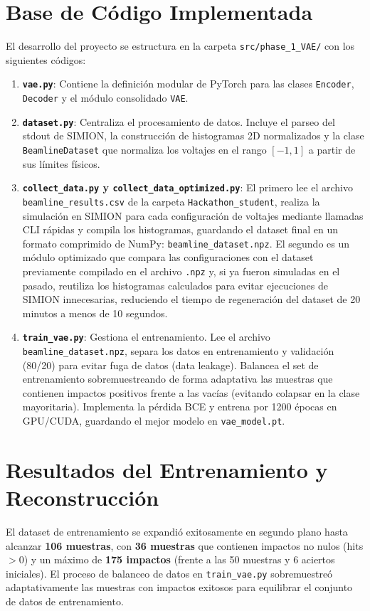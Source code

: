 \documentclass[12pt,letterpaper]{article}
\begin{document}
\section{Base de Código Implementada}
El desarrollo del proyecto se estructura en la carpeta \texttt{src/phase\_1\_VAE/} con los siguientes códigos:

\begin{enumerate}
    \item \textbf{\texttt{vae.py}}: Contiene la definición modular de PyTorch para las clases \texttt{Encoder}, \texttt{Decoder} y el módulo consolidado \texttt{VAE}.
    \item \textbf{\texttt{dataset.py}}: Centraliza el procesamiento de datos. Incluye el parseo del stdout de SIMION, la construcción de histogramas 2D normalizados y la clase \texttt{BeamlineDataset} que normaliza los voltajes en el rango $[-1, 1]$ a partir de sus límites físicos.
    \item \textbf{\texttt{collect\_data.py} y \texttt{collect\_data\_optimized.py}}: El primero lee el archivo \texttt{beamline\_results.csv} de la carpeta \texttt{Hackathon\_student}, realiza la simulación en SIMION para cada configuración de voltajes mediante llamadas CLI rápidas y compila los histogramas, guardando el dataset final en un formato comprimido de NumPy: \texttt{beamline\_dataset.npz}. El segundo es un módulo optimizado que compara las configuraciones con el dataset previamente compilado en el archivo \texttt{.npz} y, si ya fueron simuladas en el pasado, reutiliza los histogramas calculados para evitar ejecuciones de SIMION innecesarias, reduciendo el tiempo de regeneración del dataset de 20 minutos a menos de 10 segundos.
    \item \textbf{\texttt{train\_vae.py}}: Gestiona el entrenamiento. Lee el archivo \texttt{beamline\_dataset.npz}, separa los datos en entrenamiento y validación (80/20) para evitar fuga de datos (data leakage). Balancea el set de entrenamiento sobremuestreando de forma adaptativa las muestras que contienen impactos positivos frente a las vacías (evitando colapsar en la clase mayoritaria). Implementa la pérdida BCE y entrena por 1200 épocas en GPU/CUDA, guardando el mejor modelo en \texttt{vae\_model.pt}.
\end{enumerate}

\section{Resultados del Entrenamiento y Reconstrucción}
El dataset de entrenamiento se expandió exitosamente en segundo plano hasta alcanzar \textbf{106 muestras}, con \textbf{36 muestras} que contienen impactos no nulos (hits $> 0$) y un máximo de \textbf{175 impactos} (frente a las 50 muestras y 6 aciertos iniciales). El proceso de balanceo de datos en \texttt{train\_vae.py} sobremuestreó adaptativamente las muestras con impactos exitosos para equilibrar el conjunto de datos de entrenamiento.
\end{document}
